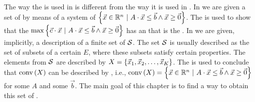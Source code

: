 \paragraph{}
The way the  is used in  is different from the way it is used in . In  we are given a set of  by means of a system of  $\left\{ \vec{x}\in\mathbb{R}^n\ |\ A\cdot\vec{x}\leq\vec{b}\wedge\vec{x}\geq\vec{0} \right\}$. The  is used to show that the  $\max\left\{ \vec{c}\cdot\vec{x}\ |\ A\cdot\vec{x}\leq\vec{b}\wedge\vec{x}\geq\vec{0} \right\}$ has an  that is the . In  we are given, implicitly, a description of a finite set of  $\mathcal{S}$. The set $\mathcal{S}$ is usually described as the set of subsets of a certain  $E$, where these subsets satisfy certain properties. The elements from $\mathcal{S}$ are described by  $X=\left\{ \vec{x}_1,\vec{x}_2,\ldots,\vec{x}_K \right\}$. The  is used to conclude that $\mbox{conv}\left( X \right)$ can be described by , i.e., $\mbox{conv}\left( X \right)=\left\{ \vec{x}\in\mathbb{R}^n\ |\ A\cdot\vec{x}\leq\vec{b}\wedge\vec{x}\geq\vec{0} \right\}$ for some  $A$ and some  $\vec{b}$. The main goal of this chapter is to find a way to obtain this set of .

